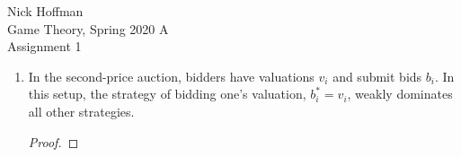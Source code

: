 \documentclass[12pt]{article}
\begin{document}
\begin{flushleft}
	Nick Hoffman \\
	Game Theory, Spring 2020 A \\
	Assignment 1 \\
\end{flushleft}

\begin{enumerate}
	\item In the second-price auction, bidders have valuations $ v_i $ and submit bids $ b_i $. In this setup, the strategy of bidding one's valuation, $ b_i^* = v_i $, weakly dominates all other strategies.
	
	\begin{proof}
		
	\end{proof} 
\end{enumerate}
\end{document}

